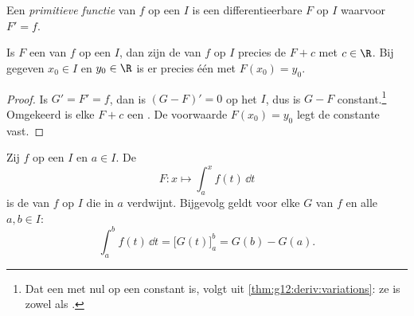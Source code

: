 \begin{definition}\label{def:g12:integ:primitive}
Een \emph{primitieve functie} van $f$ op een
 $I$ is een differentieerbare  $F$ op $I$ waarvoor $F' = f$.
\end{definition}

\begin{proposition}\label{prop:g12:integ:primunique}
Is $F$ een  van $f$ op een  $I$, dan zijn de
 van $f$ op $I$ precies de  $F + c$ met
$c \in \R$. Bij gegeven $x_0 \in I$ en $y_0 \in \R$ is er precies één
 met $F(x_0) = y_0$.
\end{proposition}

\begin{proof}
Is $G' = F' = f$, dan is $(G - F)' = 0$ op het  $I$, dus is $G - F$
constant.\footnote{Dat een  met  nul op een  constant
is, volgt uit \cref{thm:g12:deriv:variations}: ze is zowel  als
.} Omgekeerd is elke $F + c$ een . De voorwaarde
$F(x_0) = y_0$ legt de constante vast.
\end{proof}

\begin{theorem}\label{thm:g12:integ:ftc}
Zij $f$  op een  $I$ en $a \in I$. De 
\[
F \colon x \longmapsto \int_a^x f(t)\,\dd t
\]
is de  van $f$ op $I$ die in $a$ verdwijnt. Bijgevolg geldt
voor elke  $G$ van $f$ en alle $a, b \in I$:
\[
\int_a^b f(t)\,\dd t = \bigl[G(t)\bigr]_a^b = G(b) - G(a).
\]
\end{theorem}

